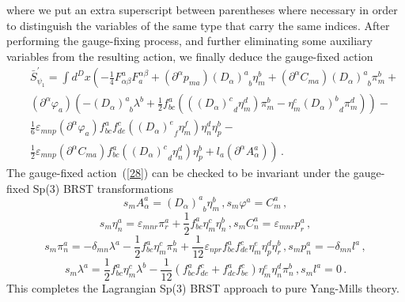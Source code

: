 \documentclass[a4paper,10pt]{article}
\begin{document}
where we put an extra superscript between parentheses where necessary in
order to distinguish the variables of the same type that carry the same
indices. After performing the gauge-fixing process, and further eliminating
some auxiliary variables from the resulting action, we finally deduce the
gauge-fixed action 
\begin{eqnarray}
\label{28}
&&\bar{S}_{\psi _{1}}^{\prime }= \int d^{D}x\left( -\frac{1}{4}F_{\alpha
\beta }^{a}F_{a}^{\alpha \beta }+\left( \partial ^{\alpha }p_{ma}\right)
\left( D_{\alpha }\right) _{\;\;b}^{a}\eta _{m}^{b}+\left( \partial ^{\alpha
}C_{ma}\right) \left( D_{\alpha }\right) _{\;\;b}^{a}\pi _{m}^{b}+\right. 
\nonumber \\
&&\left( \partial ^{\alpha }\varphi _{a}\right) \left( - \left( D_{\alpha
}\right) _{\;\;b}^{a}\lambda ^{b}+\frac{1}{2}f_{bc}^{a}\left( \left( \left(
D_{\alpha }\right) _{\;\;d}^{c}\eta _{m}^{d}\right) \pi _{m}^{b}-\eta
_{m}^{c}\left( D_{\alpha }\right) _{\;\;d}^{b}\pi _{m}^{d}\right) \right) - 
\nonumber \\
&&\frac{1}{6}\varepsilon _{mnp}\left( \partial ^{\alpha } \varphi
_{a}\right) f_{bc}^{a}f_{de}^{c}\left( \left( D_{\alpha }\right)
_{\;\;f}^{e}\eta _{m}^{f}\right) \eta _{n}^{d}\eta _{p}^{b}-  \nonumber \\
&&\left. \frac{1}{2} \varepsilon _{mnp}\left( \partial ^{\alpha
}C_{ma}\right) f_{bc}^{a}\left( \left( D_{\alpha }\right) _{\;\;d}^{c}\eta
_{n}^{d}\right) \eta _{p}^{b}+l_{a}\left( \partial ^{\alpha }A_{\alpha
}^{a}\right) \right) \,.
\end{eqnarray}
The gauge-fixed action~(\ref{28}) can be checked to be invariant under the
gauge-fixed Sp(3) BRST transformations 
\begin{equation}
\label{29}
s_{m}A_{\alpha }^{a}=\left( D_{\alpha }\right) _{\;\;b}^{a}\eta
_{m}^{b}\,, s_{m}\varphi ^{a}=C_{m}^{a}\,,
\end{equation}
\begin{equation}
\label{30}
s_{m}\eta _{n}^{a}=\varepsilon _{mnr}\pi _{r}^{a}+\frac{1}{2}f_{bc}^{a}\eta
_{m}^{c}\eta _{n}^{b}\,, s_{m}C_{n}^{a}=\varepsilon _{mnr}p_{r}^{a}\,,
\end{equation}
\begin{equation}
\label{31}
s_{m}\pi _{n}^{a}=-\delta _{mn}\lambda ^{a}-\frac{1}{2}f_{bc}^{a}\eta
_{m}^{c}\pi _{n}^{b}+\frac{1}{12}\varepsilon _{npr}f_{bc}^{a}f_{de}^{c}\eta
_{m}^{e}\eta _{p}^{d}\eta _{r}^{b}\,, s_{m}p_{n}^{a}=
-\delta _{mn}l^{a}\,,
\end{equation}
\begin{equation}
\label{32}
s_{m}\lambda ^{a}=\frac{1}{2}f_{bc}^{a}\eta _{m}^{c}\lambda ^{b}-\frac{1}{12}%
\left( f_{bc}^{a}f_{de}^{c}+f_{dc}^{a}f_{be}^{c}\right) \eta _{m}^{e}\eta
_{n}^{d}\pi _{n}^{b}\,, s_{m}l^{a}=0\,.
\end{equation}
This completes the Lagrangian Sp(3) BRST approach to pure Yang-Mills theory.
\end{document}
